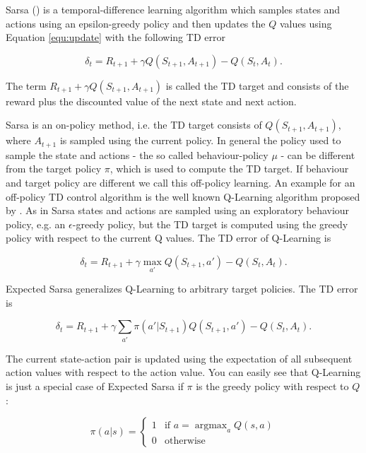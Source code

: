 \documentclass{article} %
\DeclareMathOperator*{\argmax}{argmax}
\begin{document}
Sarsa (\cite{sarsa}) is a temporal-difference learning algorithm which samples states and actions using an epsilon-greedy policy and then updates the $Q$ values using Equation \ref{equ:update} with the following TD error 

\begin{equation} 
\delta_t = R_{t+1} + \gamma Q(S_{t+1}, A_{t+1}) - Q(S_t, A_t).
\label{sarsa}
\end{equation}

The term $R_{t+1} + \gamma Q(S_{t+1}, A_{t+1})$ is called the TD target and consists of the reward plus the discounted value of the next state and next action.

Sarsa is an on-policy method, i.e. the TD target consists of $Q(S_{t+1}, A_{t+1})$, where $A_{t+1}$ is sampled using the current policy. In general the policy used to sample the state and actions - the so called behaviour-policy $\mu$ - can be different from the target policy $\pi$, which is used to compute the TD target. If behaviour and target policy are different we call this off-policy learning. An example for an off-policy TD control algorithm is the well known Q-Learning algorithm proposed by \cite{watkins1989}. As in Sarsa states and actions are sampled using an exploratory behaviour policy, e.g. an $\epsilon$-greedy policy, but the TD target is computed using the greedy policy with respect to the current Q values. The TD error of Q-Learning is

\begin{equation} 
\delta_t = R_{t+1} + \gamma \max_{a'} Q(S_{t+1}, a') - Q(S_t, A_t).
\label{qlearning}
\end{equation}

Expected Sarsa generalizes Q-Learning to arbitrary target policies. The TD error is

\begin{equation} 
\delta_t = R_{t+1} + \gamma \sum_{a'} \pi(a' | S_{t+1}) Q(S_{t+1}, a') - Q(S_t, A_t).
\label{equ:expectedsarsa}
\end{equation}

The current state-action pair is updated using the expectation of all subsequent action values with respect to the action value. You can easily see that Q-Learning is just a special case of Expected Sarsa if $\pi$ is the greedy policy with respect to $Q$:

\begin{equation} 
\pi(a | s) = \begin{cases} 1 &\mbox{if } a = \argmax_a Q(s, a) \\
0 & \mbox{otherwise} \end{cases} 
\end{equation}
\end{document}
